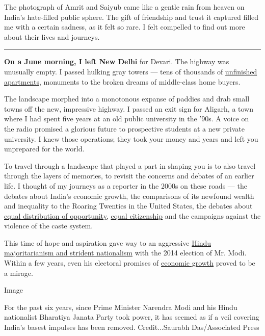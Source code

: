 The photograph of Amrit and Saiyub came like a gentle rain from heaven
on India's hate-filled public sphere. The gift of friendship and trust
it captured filled me with a certain sadness, as it felt so rare. I felt
compelled to find out more about their lives and journeys.

\begin{center}\rule{0.5\linewidth}{\linethickness}\end{center}

\textbf{On a June morning, I left New Delhi} for Devari. The highway was
unusually empty. I passed hulking gray towers --- tens of thousands of
\href{https://www.wsj.com/articles/indias-ghost-towns-saddle-middle-class-with-debtand-broken-dreams-11579189678}{unfinished
apartments}, monuments to the broken dreams of middle-class home buyers.

The landscape morphed into a monotonous expanse of paddies and drab
small towns off the new, impressive highway. I passed an exit sign for
Aligarh, a town where I had spent five years at an old public university
in the '90s. A voice on the radio promised a glorious future to
prospective students at a new private university. I knew those
operations; they took your money and years and left you unprepared for
the world.

To travel through a landscape that played a part in shaping you is to
also travel through the layers of memories, to revisit the concerns and
debates of an earlier life. I thought of my journeys as a reporter in
the 2000s on these roads --- the debates about India's economic growth,
the comparisons of its newfound wealth and inequality to the Roaring
Twenties in the United States, the debates about
\href{http://www.sacw.net/index.php?page=imprimir_articulo\&id_article=6295}{equal
distribution of opportunity},
\href{https://caravanmagazine.in/reportage/road-back-ayodhya}{equal
citizenship} and the campaigns against the violence of the caste system.

This time of hope and aspiration gave way to an aggressive
\href{https://www.theguardian.com/books/2014/may/16/what-next-india-pankaj-mishra}{Hindu
majoritarianism and strident nationalism} with the 2014 election of Mr.
Modi. Within a few years, even his electoral promises of
\href{https://www.nytimes.com/2019/02/01/opinion/india-unemployment-jobs-blackout.html}{economic
growth} proved to be a mirage.

Image

For the past six years, since Prime Minister Narendra Modi and his Hindu
nationalist Bharatiya Janata Party took power, it has seemed as if a
veil covering India's basest impulses has been removed. Credit...Saurabh
Das/Associated Press

